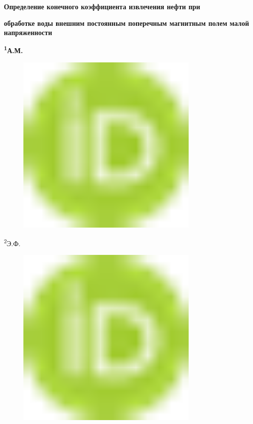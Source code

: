 
{\bfseries Определение конечного коэффициента извлечения нефти при}

{\bfseries обработке воды внешним постоянным поперечным магнитным полем
малой напряженности}

{\bfseries \textsuperscript{1}А.М.
\begin{figure}[H]
	\centering
	\includegraphics[width=0.8\textwidth]{media/gorn4/image1}
	\caption*{}
\end{figure}

\textsuperscript{2}Э.Ф.
\begin{figure}[H]
	\centering
	\includegraphics[width=0.8\textwidth]{media/gorn4/image1}
	\caption*{}
\end{figure}

}
